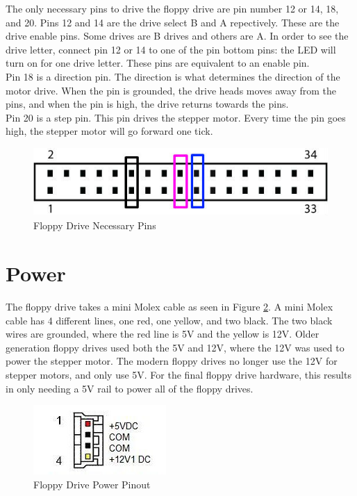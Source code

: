 \documentclass[11pt, a4paper]{report}
\begin{document}
The only necessary pins to drive the floppy drive are pin number 12 or 14, 18, and 20. Pins 12 and 14 are the drive select B and A repectively. These are the drive enable pins. Some drives are B drives and others are A. In order to see the drive letter, connect pin 12 or 14 to one of the pin bottom pins: the LED will turn on for one drive letter. These pins are equivalent to an enable pin.\\

Pin 18 is a direction pin. The direction is what determines the direction of the motor drive. When the pin is grounded, the drive heads moves away from the pins, and when the pin is high, the drive returns towards the pins. \\

Pin 20 is a step pin. This pin drives the stepper motor. Every time the pin goes high, the stepper motor will go forward one tick.\\


\begin{figure}[H]
\hspace*{-2cm}    
    \centering
    \includegraphics[width=.75\textwidth]{floppy_pinoutV1.jpg}
    \caption{Floppy Drive Necessary Pins}
    \label{fig:pins}
\end{figure}

\section{Power}

The floppy drive takes a mini Molex cable as seen in Figure \ref{fig:miniMolex}. A mini Molex cable has 4 different lines, one red, one yellow, and two black. The two black wires are grounded, where the red line is 5V and the yellow is 12V. Older generation floppy drives used both the 5V and 12V, where the 12V was used to power the stepper motor. The modern floppy drives no longer use the 12V for stepper motors, and only use 5V. For the final floppy drive hardware, this results in only needing a 5V rail to power all of the floppy drives.

\begin{figure}[H]
\hspace*{-2cm}    
    \centering
    \includegraphics[width=.4\textwidth]{miniMolex.jpg}
    \caption{Floppy Drive Power Pinout}
    \label{fig:miniMolex}
\end{figure}
\end{document}
